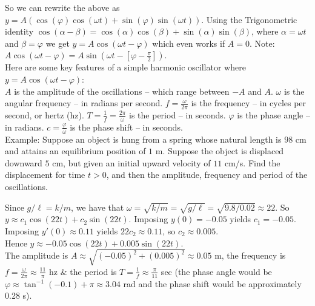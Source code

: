 \documentclass{ximera}
\begin{document}
 So we can rewrite the above as $y=A\left(\cos{(\varphi)}\cos{(\omega t)}+\sin{(\varphi)}\sin{(\omega t)}\right)$.   Using the Trigonometric identity $\cos{(\alpha-\beta)}=\cos{(\alpha)}\cos{(\beta)}+\sin{(\alpha)}\sin{(\beta)}$, where $\alpha=\omega t$ and $\beta=\varphi$ we get $y=A\cos{(\omega t-\varphi)}$ which even works if $A=0$.   Note: $A\cos{(\omega t-\varphi)}=A\sin{\left(\omega t-\left[\varphi-\frac{\pi}{2}\right]\right)}$.\\


 Here are some key features of a simple harmonic oscillator where $y=A\cos{(\omega t-\varphi)}$:\\

 $A$ is the amplitude of the oscillations -- which range between $-A$ and $A$.  $\omega$ is the angular frequency -- in radians per second.   $f=\frac{\omega}{2\pi}$ is the frequency -- in cycles per second, or hertz (hz).   $T=\frac{1}{f}=\frac{2\pi}{\omega}$ is the period -- in seconds.  $\varphi$ is the phase angle -- in radians.   $c=\frac{\varphi}{\omega}$ is the phase shift -- in seconds.\\



 Example:   Suppose an object is hung from a spring whose natural length is $98$ cm and attains an equilibrium position of $1$ m.  Suppose the object is displaced downward $5$ cm, but given an initial upward velocity of $11$ cm/s.  Find the displacement for time $t>0$, and then the amplitude, frequency and period of the oscillations.

 Since $g/\ell=k/m$, we have that $\omega=\sqrt{k/m}=\sqrt{g/\ell}=\sqrt{9.8/0.02}\approx 22$.  So \\$y\approx c_{1}\cos{(22t)}+c_{2}\sin{(22t)}$.  Imposing $y(0)=-0.05$ yields $c_{1}=-0.05$.   Imposing $y'(0)\approx 0.11$ yields $22c_{2}\approx 0.11$, so $c_{2}\approx 0.005$.\\

 Hence $y\approx -0.05\cos{(22t)}+0.005\sin{(22t)}$.\\

 The amplitude is $A\approx \sqrt{(-0.05)^2+(0.005)^2}\approx 0.05$ m,  the frequency is $f=\frac{\omega}{2\pi}\approx \frac{11}{\pi}$ hz \& the period is $T=\frac{1}{f}\approx \frac{\pi}{11}$ sec (the phase angle would be $\varphi\approx \tan^{-1}{(-0.1)}+\pi\approx 3.04$ rad and the phase shift would be approximately 0.28 s).\\

\newpage
\end{document}
